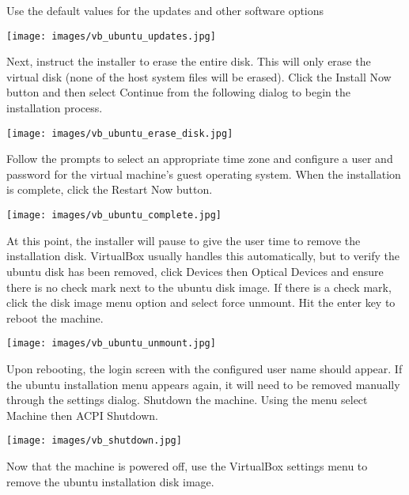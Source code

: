 \documentclass{article}
\begin{document}
Use the default values for the updates and other software options

\begin{center}
\texttt{[image: images/vb\_ubuntu\_updates.jpg]}
\end{center}

Next, instruct the installer to erase the entire disk.  This will only erase the virtual disk (none of the host system files will be erased).  Click the Install Now button and then select Continue from the following dialog to begin the installation process.

\begin{center}
\texttt{[image: images/vb\_ubuntu\_erase\_disk.jpg]}
\end{center}

Follow the prompts to select an appropriate time zone and configure a user and password for the virtual machine's guest operating system.  When the installation is complete, click the Restart Now button.

\begin{center}
\texttt{[image: images/vb\_ubuntu\_complete.jpg]}
\end{center}

At this point, the installer will pause to give the user time to remove the installation disk.  VirtualBox usually handles this automatically, but to verify the ubuntu disk has been removed, click Devices then Optical Devices and ensure there is no check mark next to the ubuntu disk image.  If there is a check mark, click the disk image menu option and select force unmount.  Hit the enter key to reboot the machine.

\begin{center}
\texttt{[image: images/vb\_ubuntu\_unmount.jpg]}
\end{center}

Upon rebooting, the login screen with the configured user name should appear.  If the ubuntu installation menu appears again, it will need to be removed manually through the settings dialog.  Shutdown the machine.  Using the menu select Machine then ACPI Shutdown.

\begin{center}
\texttt{[image: images/vb\_shutdown.jpg]}
\end{center}

Now that the machine is powered off, use the VirtualBox settings menu to remove the ubuntu installation disk image.
\end{document}
